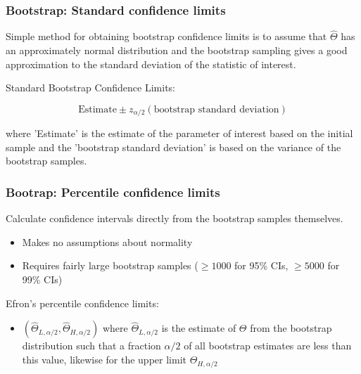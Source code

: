 \documentclass{beamer}
\begin{document}
\begin{frame}
  \frametitle{Bootstrap: Standard confidence limits}
  
Simple method for obtaining bootstrap confidence limits is to assume that $\widehat{\Theta}$ has an approximately normal distribution and the bootstrap sampling gives a good approximation to the standard deviation of the statistic of interest.
\medskip

Standard Bootstrap Confidence Limits:

\[
\mbox{Estimate} \pm z_{\alpha/2} (\mbox{bootstrap standard deviation})
\]

where 'Estimate' is the estimate of the parameter of interest based on the initial sample and the 'bootstrap standard deviation' is based on the variance of the bootstrap samples.

\end{frame}
\begin{frame}
  \frametitle{Bootrap: Percentile confidence limits}
  
Calculate confidence intervals directly from the bootstrap samples themselves.

\begin{itemize}
    \item Makes no assumptions about normality
    \item Requires fairly large bootstrap samples ($\geq 1000$ for 95\% CIs, $\geq 5000$ for 99\% CIs)
\end{itemize}

Efron's percentile confidence limits:
\begin{itemize}
    \item $(\widehat{\Theta}_{L,\alpha/2}, \widehat{\Theta}_{H,\alpha/2})$ where $\widehat{\Theta}_{L,\alpha/2}$ is the estimate of $\Theta$ from the bootstrap distribution such that a fraction $\alpha/2$ of all bootstrap estimates are less than this value, likewise for the upper limit $\widehat{\Theta}_{H,\alpha/2}$
\end{itemize}


\end{frame}
\end{document}
